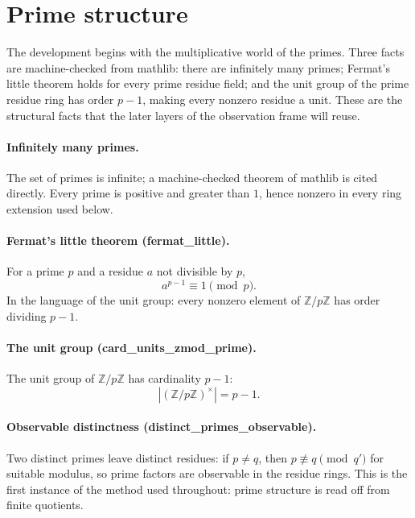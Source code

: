 \documentclass[sigplan,10pt,anonymous,review]{acmart}
\begin{document}
\section{Prime structure}

The development begins with the multiplicative world of the primes.
Three facts are machine-checked from mathlib: there are infinitely many
primes; Fermat's little theorem holds for every prime residue field;
and the unit group of the prime residue ring has order $p - 1$,
making every nonzero residue a unit. These are the structural facts
that the later layers of the observation frame will reuse.

\paragraph{Infinitely many primes.} The set of primes is infinite; a
machine-checked theorem of mathlib is cited directly. Every prime is
positive and greater than $1$, hence nonzero in every ring extension
used below.

\paragraph{Fermat's little theorem (fermat\_little).} For a prime $p$
and a residue $a$ not divisible by $p$,
\begin{equation*}
  a^{p-1} \equiv 1 \pmod{p}.
\end{equation*}
In the language of the unit group: every nonzero element of
$\mathbb{Z}/p\mathbb{Z}$ has order dividing $p - 1$.

\paragraph{The unit group (card\_units\_zmod\_prime).} The unit group
of $\mathbb{Z}/p\mathbb{Z}$ has cardinality $p - 1$:
\begin{equation*}
  |(\mathbb{Z}/p\mathbb{Z})^\times| = p - 1.
\end{equation*}

\paragraph{Observable distinctness (distinct\_primes\_observable).}
Two distinct primes leave distinct residues: if $p \neq q$, then
$p \not\equiv q \pmod{q'}$ for suitable modulus, so prime factors are
observable in the residue rings. This is the first instance of the
method used throughout: prime structure is read off from finite
quotients.
\end{document}

